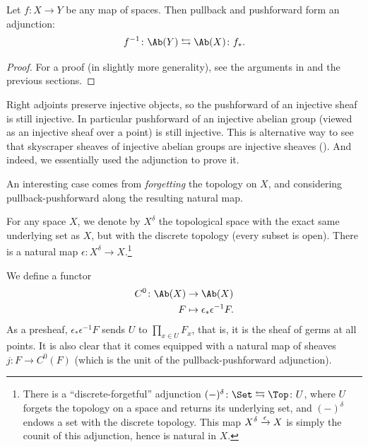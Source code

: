 \documentclass[11pt]{book}
\begin{document}
\begin{proposition}\label{prop:pullback-pushforward-adjunction} Let $f \colon X \to Y$ be any map of spaces. Then pullback and pushforward form an adjunction:
\begin{align*}
    f^{-1} \colon \Ab(Y) \leftrightarrows \Ab(X) \colon f_\ast.
\end{align*}
\end{proposition}
\begin{proof} For a proof (in slightly more generality), see the arguments in \cite[008P]{Stacks} and the previous sections.
\end{proof}

\begin{remark} Right adjoints preserve injective objects, so the pushforward of an injective sheaf is still injective. In particular pushforward of an injective abelian group (viewed as an injective sheaf over a point) is still injective. This is alternative way to see that skyscraper sheaves of injective abelian groups are injective sheaves (). And indeed, we essentially used the adjunction  to prove it.
\end{remark}

An interesting case comes from \emph{forgetting} the topology on $X$, and considering pullback-pushforward along the resulting natural map.

\begin{notation} For any space $X$, we denote by $X^\delta$ the topological space with the exact same underlying set as $X$, but with the discrete topology (every subset is open). There is a natural map $\epsilon \colon X^\delta \to X$.\footnote{There is a ``discrete-forgetful'' adjunction $(-)^\delta \colon \Set \leftrightarrows \Top \colon U$, where $U$ forgets the topology on a space and returns its underlying set, and $(-)^\delta$ endows a set with the discrete topology. This map $X^\delta \xrightarrow{\epsilon} X$ is simply the counit of this adjunction, hence is natural in $X$.}
\end{notation}

We define a functor
\begin{align*}
    C^0 \colon \Ab(X) &\to \Ab(X) \\
    F &\mapsto \epsilon_\ast \epsilon^{-1} F.
\end{align*}
%
As a presheaf, $\epsilon_\ast \epsilon^{-1} F$ sends $U$ to $\prod_{x\in U} F_x$, that is, it is the sheaf of germs at all points. It is also clear that it comes equipped with a natural map of sheaves $j \colon F \to C^0(F)$ (which is the unit of the pullback-pushforward adjunction).
\end{document}
